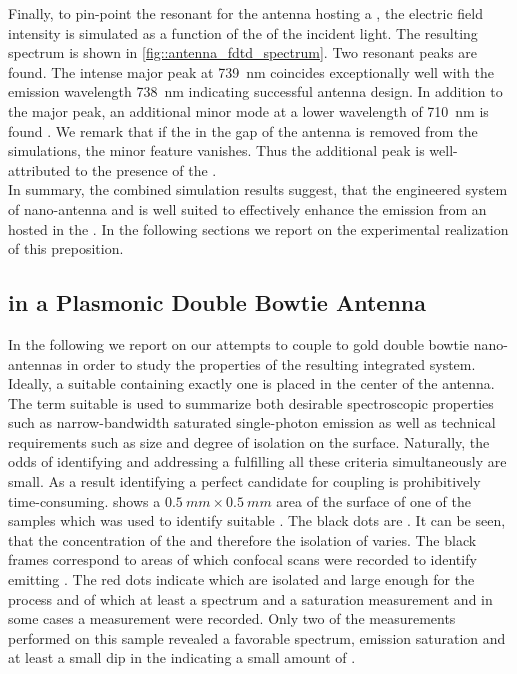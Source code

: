 		Finally, to pin-point the resonant \wl for the antenna hosting a \nd, the electric field intensity is simulated as a function of the \wl of the incident light. The resulting spectrum is shown in \cref{fig::antenna_fdtd_spectrum}. Two resonant peaks are found. The intense major peak at \SI{739}{nm} coincides exceptionally well with the \siv emission wavelength \SI{738}{nm} indicating successful antenna design. In addition to the major peak, an additional minor mode at a lower wavelength of \SI{710}{nm} is found \cite{Rahbany2016}. We remark that if the \nd in the gap of the antenna is removed from the simulations, the minor feature vanishes. Thus the additional peak is well-attributed to the presence of the \nd.
		\\
		In summary, the combined simulation results suggest, that the engineered system of nano-antenna and \nd is well suited to effectively enhance the emission from an \siv hosted in the \nd. In the following sections we report on the experimental realization of this preposition.

	\subsection{\siv in a Plasmonic Double Bowtie Antenna}

		In the following we report on our attempts to couple \sivs to gold double bowtie nano-antennas in order to study the properties of the resulting integrated system. Ideally, a suitable \nd containing exactly one \siv is placed in the center of the antenna. The term suitable is used to summarize both desirable spectroscopic properties such as narrow-bandwidth saturated single-photon emission as well as technical requirements such as \nd size and degree of isolation on the surface. Naturally, the odds of identifying and addressing a \nd fulfilling all these criteria simultaneously are small. 
		As a result identifying a perfect candidate for coupling is prohibitively time-consuming. 
		 shows a $\SI{0.5}{mm}\times\SI{0.5}{mm}$ area of the surface of one of the samples which was used to identify suitable \nds.
		The black dots are \nds.
		It can be seen, that the concentration of the \nds and therefore the isolation of \nds varies.
		The black frames correspond to areas of which confocal scans were recorded to identify \nds emitting \fl.
		The red dots indicate \nds which are isolated and large enough for the \pp process and of which at least a \pl spectrum and a saturation measurement and in some cases a \gt measurement were recorded.
		Only two of the measurements performed on this sample revealed a favorable spectrum, emission saturation and at least a small dip in the \gtf indicating a small amount of \sivs.

